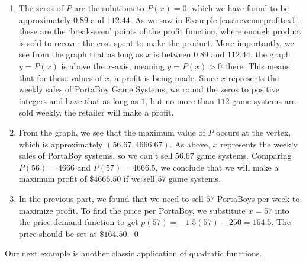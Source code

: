 \begin{ex}
\begin{enumerate}
\begin{center}
\end{center}

\item  The zeros of $P$ are the solutions to $P(x)=0$, which we have found to be approximately $0.89$ and $112.44$.  As we saw in Example \ref{costrevenueprofitex1}, these are the `break-even' points of the profit function, where enough product is sold to recover the cost spent to make the product.  More importantly, we see from the graph that as long as $x$ is between $0.89$ and $112.44$, the graph $y=P(x)$ is above the $x$-axis, meaning $y = P(x) > 0$ there.  This means that for these values of $x$, a profit is being made.  Since $x$ represents the weekly sales of PortaBoy Game Systems, we round the zeros to positive integers and have that as long as $1$, but no more than $112$ game systems are sold weekly, the retailer will make a profit.

\item  From the graph, we see that the maximum value of $P$ occurs at the vertex, which is approximately $(56.67,4666.67)$.  As above, $x$ represents the weekly sales of PortaBoy systems, so we can't sell $56.67$ game systems.  Comparing $P(56) = 4666$ and $P(57)=4666.5$, we conclude that we will make a maximum profit of $\$ 4666.50$ if we sell $57$ game systems.

\item  In the previous part, we found that we need to sell $57$ PortaBoys per week to maximize profit.  To find the price per PortaBoy, we substitute $x=57$ into the price-demand function to get  $p(57) = -1.5(57)+250 = 164.5$.   The price should be set at $\$164.50$. \qed

\end{enumerate}

\end{ex}

Our next example is another classic application of quadratic functions.


